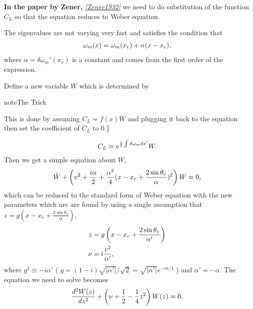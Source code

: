 \documentclass[letterpaper,12pt,english]{sphinxmanual}
\begin{document}
\textbf{In the paper by Zener,} \label{msw:id2}{\hyperref[msw:zener1932]{\emph{{[}Zener1932{]}}}} we need to do substitution of the function \(C_L\) so that the equation reduces to Weber equation.

The eigenvalues are not varying very fast and satisfies the condition that
\begin{gather}
\begin{split}\omega_m(x) =  \omega_m(x_r) +  \alpha (x-x_r),\end{split}\notag
\end{gather}
where \(\alpha = \delta \omega_m'(x_r)\) is a constant and comes from the first order of the expression.

Define a new variable \(W\) which is determined by

\begin{notice}{note}{The Trick}

This is done by assuming \(C_L=f(x)W\) and plugging it back to the equation then set the coefficient of \(\dot C_L\) to \(0\).\}
\end{notice}
\begin{gather}
\begin{split}C_L = e^{ \frac{i}{2}\int \delta \omega_m dx' } W.\end{split}\notag
\end{gather}
Then we get a simple equation about \(W\),
\begin{gather}
\begin{split}\ddot W + \left( v^2 + \frac{i \alpha}{2} + \frac{\alpha^2 }{4} (x - x_r + \frac{2\sin\theta_v}{\alpha})^2  \right) W = 0,\end{split}\notag
\end{gather}
which can be reduced to the standard form of Weber equation with the new parameters which are are found by using a single assumption that \(z=g(x- x_r + \frac{2\sin\theta_v}{\alpha})\),
\begin{gather}
\begin{split}z &= g \left(x - x_r + \frac{2\sin\theta_v}{ \alpha'} \right) \\
\nu &= i \frac{v^2}{\alpha'},\end{split}\notag
\end{gather}
where \(g^2\equiv -i\alpha'\) ( \(g=(1-i)\sqrt{\left\vert \alpha' \right\vert } /\sqrt{2}=\sqrt{\left\vert \alpha' \right\vert }e^{-i\pi/4}\) ) and \(\alpha' = -\alpha\). The equation we need to solve becomes
\begin{gather}
\begin{split}\frac{d^2 W(z)}{dz^2} + \left( \nu +\frac{1}{2} - \frac{1}{4}z^2 \right) W(z) = 0 .\end{split}\notag
\end{gather}
\end{document}
